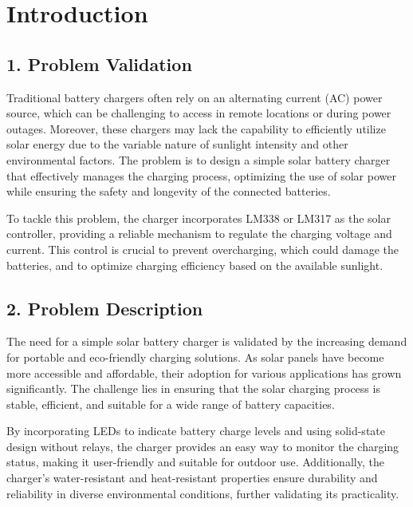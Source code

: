 \documentclass[twocolumn]{article}
\begin{document}
\section*{Introduction}
    \subsection*{1. Problem Validation}
    Traditional battery chargers often rely on an   alternating current (AC) power source, which can be challenging to access in remote locations or during power outages. Moreover, these chargers may lack the capability to efficiently utilize solar energy due to the variable nature of sunlight intensity and other environmental factors. The problem is to design a simple solar battery charger that effectively manages the charging process, optimizing the use of solar power while ensuring the safety and longevity of the connected batteries.
    \vspace{5pt}
    
    \noindent To tackle this problem, the charger incorporates LM338 or LM317 as the solar controller, providing a reliable mechanism to regulate the charging voltage and current. This control is crucial to prevent overcharging, which could damage the batteries, and to optimize charging efficiency based on the available sunlight.
    
    \subsection*{2. Problem Description}
    The need for a simple solar battery charger is validated by the increasing demand for portable and eco-friendly charging solutions. As solar panels have become more accessible and affordable, their adoption for various applications has grown significantly. The challenge lies in ensuring that the solar charging process is stable, efficient, and suitable for a wide range of battery capacities.
    \vspace{5pt}
    
    \noindent By incorporating LEDs to indicate battery charge levels and using solid-state design without relays, the charger provides an easy way to monitor the charging status, making it user-friendly and suitable for outdoor use. Additionally, the charger's water-resistant and heat-resistant properties ensure durability and reliability in diverse environmental conditions, further validating its practicality.
    \vspace{5pt}
    
\end{document}
